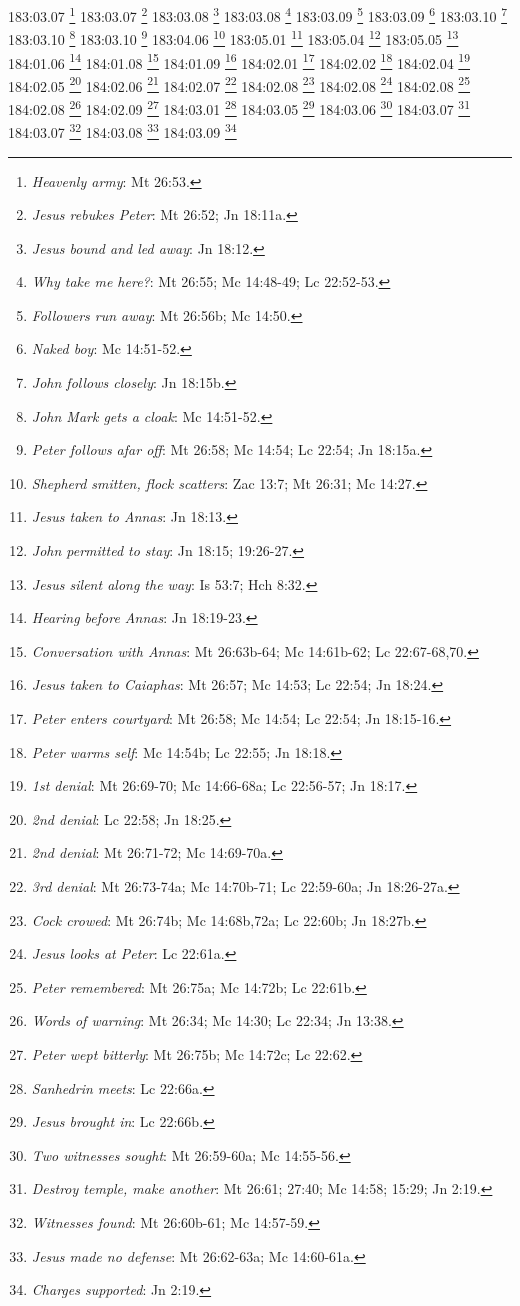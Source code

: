 183:03.07 \footnote{\textit{Heavenly army}: Mt 26:53.}
183:03.07 \footnote{\textit{Jesus rebukes Peter}: Mt 26:52; Jn 18:11a.}
183:03.08 \footnote{\textit{Jesus bound and led away}: Jn 18:12.}
183:03.08 \footnote{\textit{Why take me here?}: Mt 26:55; Mc 14:48-49; Lc 22:52-53.}
183:03.09 \footnote{\textit{Followers run away}: Mt 26:56b; Mc 14:50.}
183:03.09 \footnote{\textit{Naked boy}: Mc 14:51-52.}
183:03.10 \footnote{\textit{John follows closely}: Jn 18:15b.}
183:03.10 \footnote{\textit{John Mark gets a cloak}: Mc 14:51-52.}
183:03.10 \footnote{\textit{Peter follows afar off}: Mt 26:58; Mc 14:54; Lc 22:54; Jn 18:15a.}
183:04.06 \footnote{\textit{Shepherd smitten, flock scatters}: Zac 13:7; Mt 26:31; Mc 14:27.}
183:05.01 \footnote{\textit{Jesus taken to Annas}: Jn 18:13.}
183:05.04 \footnote{\textit{John permitted to stay}: Jn 18:15; 19:26-27.}
183:05.05 \footnote{\textit{Jesus silent along the way}: Is 53:7; Hch 8:32.}
184:01.06 \footnote{\textit{Hearing before Annas}: Jn 18:19-23.}
184:01.08 \footnote{\textit{Conversation with Annas}: Mt 26:63b-64; Mc 14:61b-62; Lc 22:67-68,70.}
184:01.09 \footnote{\textit{Jesus taken to Caiaphas}: Mt 26:57; Mc 14:53; Lc 22:54; Jn 18:24.}
184:02.01 \footnote{\textit{Peter enters courtyard}: Mt 26:58; Mc 14:54; Lc 22:54; Jn 18:15-16.}
184:02.02 \footnote{\textit{Peter warms self}: Mc 14:54b; Lc 22:55; Jn 18:18.}
184:02.04 \footnote{\textit{1st denial}: Mt 26:69-70; Mc 14:66-68a; Lc 22:56-57; Jn 18:17.}
184:02.05 \footnote{\textit{2nd denial}: Lc 22:58; Jn 18:25.}
184:02.06 \footnote{\textit{2nd denial}: Mt 26:71-72; Mc 14:69-70a.}
184:02.07 \footnote{\textit{3rd denial}: Mt 26:73-74a; Mc 14:70b-71; Lc 22:59-60a; Jn 18:26-27a.}
184:02.08 \footnote{\textit{Cock crowed}: Mt 26:74b; Mc 14:68b,72a; Lc 22:60b; Jn 18:27b.}
184:02.08 \footnote{\textit{Jesus looks at Peter}: Lc 22:61a.}
184:02.08 \footnote{\textit{Peter remembered}: Mt 26:75a; Mc 14:72b; Lc 22:61b.}
184:02.08 \footnote{\textit{Words of warning}: Mt 26:34; Mc 14:30; Lc 22:34; Jn 13:38.}
184:02.09 \footnote{\textit{Peter wept bitterly}: Mt 26:75b; Mc 14:72c; Lc 22:62.}
184:03.01 \footnote{\textit{Sanhedrin meets}: Lc 22:66a.}
184:03.05 \footnote{\textit{Jesus brought in}: Lc 22:66b.}
184:03.06 \footnote{\textit{Two witnesses sought}: Mt 26:59-60a; Mc 14:55-56.}
184:03.07 \footnote{\textit{Destroy temple, make another}: Mt 26:61; 27:40; Mc 14:58; 15:29; Jn 2:19.}
184:03.07 \footnote{\textit{Witnesses found}: Mt 26:60b-61; Mc 14:57-59.}
184:03.08 \footnote{\textit{Jesus made no defense}: Mt 26:62-63a; Mc 14:60-61a.}
184:03.09 \footnote{\textit{Charges supported}: Jn 2:19.}
